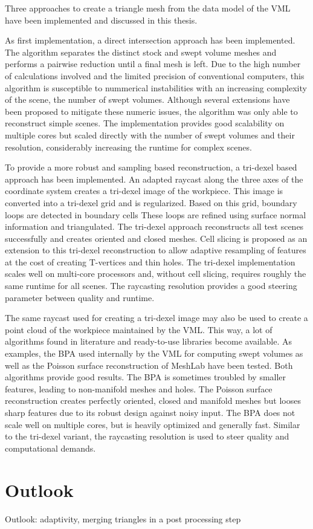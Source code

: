 Three approaches to create a triangle mesh from the data model of the VML have been implemented and discussed in this thesis.


As first implementation, a direct intersection approach has been implemented.
The algorithm separates the distinct stock and swept volume meshes and performs a pairwise reduction until a final mesh is left.
Due to the high number of calculations involved and the limited precision of conventional computers, this algorithm is susceptible to nummerical instabilities with an increasing complexity of the scene, \eg the number of swept volumes.
Although several extensions have been proposed to mitigate these numeric issues, the algorithm was only able to reconstruct simple scenes.
The implementation provides good scalability on multiple cores but scaled directly with the number of swept volumes and their resolution, considerably increasing the runtime for complex scenes.

To provide a more robust and sampling based reconstruction, a tri-dexel based approach has been implemented.
An adapted raycast along the three axes of the coordinate system creates a tri-dexel image of the workpiece.
This image is converted into a tri-dexel grid and is regularized.
Based on this grid, boundary loops are detected in boundary cells
These loops are refined using surface normal information and triangulated.
The tri-dexel approach reconstructs all test scenes successfully and creates oriented and closed meshes.
Cell slicing is proposed as an extension to this tri-dexel reconstruction to allow adaptive resampling of features at the cost of creating T-vertices and thin holes.
The tri-dexel implementation scales well on multi-core processors and, without cell slicing, requires roughly the same runtime for all scenes.
The raycasting resolution provides a good steering parameter between quality and runtime.

The same raycast used for creating a tri-dexel image may also be used to create a point cloud of the workpiece maintained by the VML.
This way, a lot of algorithms found in literature and ready-to-use libraries become available.
As examples, the BPA used internally by the VML for computing swept volumes as well as the Poisson surface reconstruction of MeshLab have been tested.
Both algorithms provide good results.
The BPA is sometimes troubled by smaller features, leading to non-manifold meshes and holes.
The Poisson surface reconstruction creates perfectly oriented, closed and manifold meshes but looses sharp features due to its robust design against noisy input.
The BPA does not scale well on multiple cores, but is heavily optimized and generally fast.
Similar to the tri-dexel variant, the raycasting resolution is used to steer quality and computational demands.

\section{Outlook}
\label{sec:outlook}




Outlook:
adaptivity, merging triangles in a post processing step
